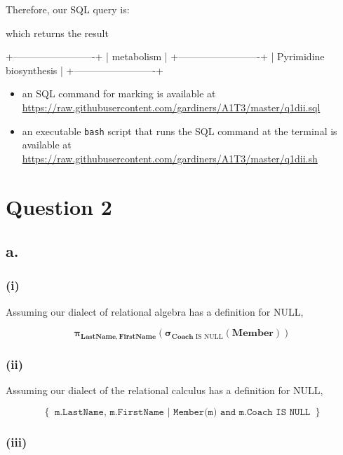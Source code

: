 \documentclass{article}
\newcommand{\select}[1]{
\boldsymbol{\sigma}_{#1}
}
\newcommand{\project}[1]{
\boldsymbol{\pi}_{#1}
}
\begin{document}
Therefore, our SQL query is:


which returns the result

\begin{bashinline}
+-------------------------+
| metabolism              |
+-------------------------+
| Pyrimidine biosynthesis |
+-------------------------+ 
\end{bashinline}

\begin{itemize}
    \item an SQL command for marking is available at \url{https://raw.githubusercontent.com/gardiners/A1T3/master/q1dii.sql}
    \item an executable \texttt{bash} script that runs the SQL command at the terminal is available at \url{https://raw.githubusercontent.com/gardiners/A1T3/master/q1dii.sh}
\end{itemize}

\section{Question 2}

\subsection{a.}

\subsubsection{(i)}

Assuming our dialect of relational algebra has a definition for NULL,

$$
\project{\mathbf{LastName, FirstName}}
\left(
\select{\mathbf{Coach} \text{ IS NULL}}\left(\mathbf{Member}\right)
\right)
$$

\subsubsection{(ii)}

Assuming our dialect of the relational calculus has a definition for NULL,

$$
\left\{
\texttt{ m.LastName, m.FirstName | Member(m) and m.Coach IS NULL }
\right\}
$$

\subsubsection{(iii)}
\end{document}
